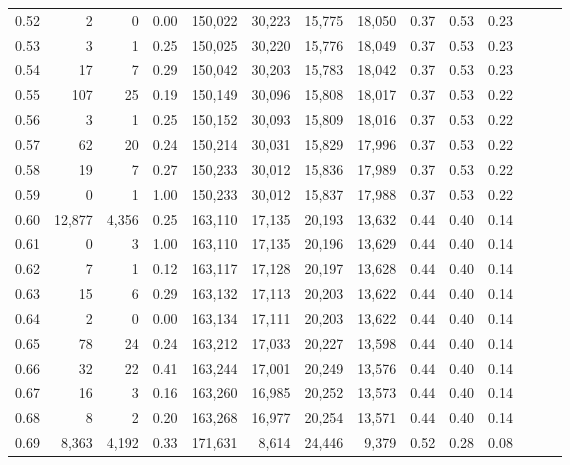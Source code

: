 \begin{tabular}{rrrrrrrrrrrrrr}
0.52 &       2 &      0 &  0.00 &  150,022 &   30,223 &  15,775 &  18,050 &  0.37 &  0.53 &      0.23 \\
0.53 &       3 &      1 &  0.25 &  150,025 &   30,220 &  15,776 &  18,049 &  0.37 &  0.53 &      0.23 \\
0.54 &      17 &      7 &  0.29 &  150,042 &   30,203 &  15,783 &  18,042 &  0.37 &  0.53 &      0.23 \\
0.55 &     107 &     25 &  0.19 &  150,149 &   30,096 &  15,808 &  18,017 &  0.37 &  0.53 &      0.22 \\
0.56 &       3 &      1 &  0.25 &  150,152 &   30,093 &  15,809 &  18,016 &  0.37 &  0.53 &      0.22 \\
0.57 &      62 &     20 &  0.24 &  150,214 &   30,031 &  15,829 &  17,996 &  0.37 &  0.53 &      0.22 \\
0.58 &      19 &      7 &  0.27 &  150,233 &   30,012 &  15,836 &  17,989 &  0.37 &  0.53 &      0.22 \\
0.59 &       0 &      1 &  1.00 &  150,233 &   30,012 &  15,837 &  17,988 &  0.37 &  0.53 &      0.22 \\
0.60 &  12,877 &  4,356 &  0.25 &  163,110 &   17,135 &  20,193 &  13,632 &  0.44 &  0.40 &      0.14 \\
0.61 &       0 &      3 &  1.00 &  163,110 &   17,135 &  20,196 &  13,629 &  0.44 &  0.40 &      0.14 \\
0.62 &       7 &      1 &  0.12 &  163,117 &   17,128 &  20,197 &  13,628 &  0.44 &  0.40 &      0.14 \\
0.63 &      15 &      6 &  0.29 &  163,132 &   17,113 &  20,203 &  13,622 &  0.44 &  0.40 &      0.14 \\
0.64 &       2 &      0 &  0.00 &  163,134 &   17,111 &  20,203 &  13,622 &  0.44 &  0.40 &      0.14 \\
0.65 &      78 &     24 &  0.24 &  163,212 &   17,033 &  20,227 &  13,598 &  0.44 &  0.40 &      0.14 \\
0.66 &      32 &     22 &  0.41 &  163,244 &   17,001 &  20,249 &  13,576 &  0.44 &  0.40 &      0.14 \\
0.67 &      16 &      3 &  0.16 &  163,260 &   16,985 &  20,252 &  13,573 &  0.44 &  0.40 &      0.14 \\
0.68 &       8 &      2 &  0.20 &  163,268 &   16,977 &  20,254 &  13,571 &  0.44 &  0.40 &      0.14 \\
0.69 &   8,363 &  4,192 &  0.33 &  171,631 &    8,614 &  24,446 &   9,379 &  0.52 &  0.28 &      0.08 \\

\end{tabular}
